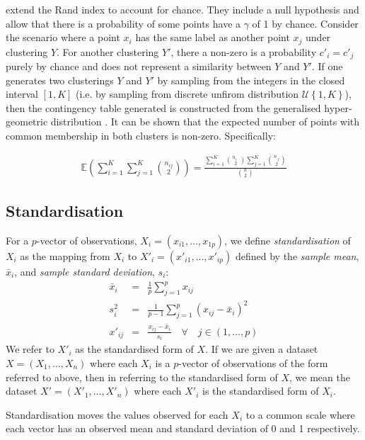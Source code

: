 \documentclass[12pt]{article} %
\begin{document}
	\citet{HubertComparingpartitions1985} extend the Rand index to account for chance. They include a null hypothesis and allow that there is a probability of some points have a $\gamma$ of 1 by chance. Consider the scenario where a point $x_i$ has the same label as another point $x_j$ under clustering $Y$. For another clustering $Y'$, there a non-zero is a probability $c'_i=c'_j$ purely by chance and does not represent a similarity between $Y$ and $Y'$. If one generates two clusterings $Y$ and $Y'$ by sampling from the integers in the closed interval $[1,K]$ (i.e. by sampling from discrete unfirom distribution $\mathcal{U}\left\{1,K\right\}$), then the contingency table generated is constructed from the generalised hyper-geometric distribution \cite{HubertComparingpartitions1985}. It can be shown that the expected number of points with common membership in both clusters is non-zero. Specifically:
	
	\begin{eqnarray}
	\mathbb{E}\left(\sum_{i=1}^K \sum_{j=1}^K\binom{n_{ij}}{2}\right) = \frac{\sum_{i=1}^K \binom{n_{i\cdot}}{2} \sum_{j=1}^K \binom{n_{\cdot j}}{2}}{\binom{n}{2}}
	\end{eqnarray}
	
	\subsection{Standardisation} \label{sec:standardisation}
	For a $p$-vector of observations, $X_i=(x_{i1},\ldots,x_{1p})$, we define \emph{standardisation} of $X_i$ as the mapping from $X_i$ to $X'_i=(x'_{i1},\ldots,x'_{ip})$ defined by the \emph{sample mean}, $\bar{x}_i$, and \emph{sample standard deviation}, $s_i$:
	\begin{eqnarray} \label{eqn:standardisation}
	\bar{x}_i &=& \frac{1}{p}\sum_{j=1}^p x_{ij} \\
	s_i^2 &=& \frac{1}{p - 1}\sum_{j=1}^p \left( x_{ij} - \bar{x}_i \right) ^2 \\
	x'_{ij} &=& \frac{x_{ij}- \bar{x}_i}{s_i} \quad \forall \quad j \in (1,\ldots,p)
	\end{eqnarray}
	We refer to $X'_i$ as the standardised form of $X$. If we are given a dataset $X=(X_1,\ldots,X_n)$ where each $X_i$ is a $p$-vector of observations of the form referred to above, then in referring to the standardised form of $X$, we mean the dataset $X'=(X'_1,\ldots,X'_n)$ where each $X'_i$ is the standardised form of $X_i$.
	
	Standardisation moves the values observed for each $X_i$ to a common scale where each vector has an observed mean and standard deviation of 0 and 1 respectively.
\end{document}
